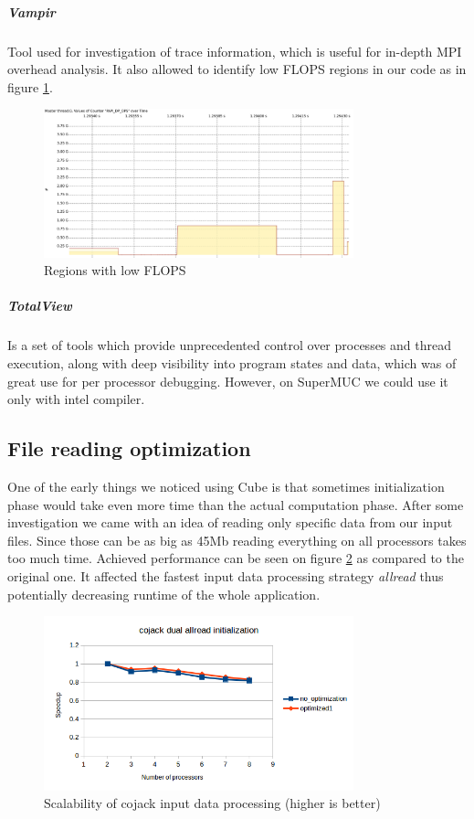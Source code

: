 \documentclass{article}
\begin{document}
\subparagraph{Vampir}
Tool used for investigation of trace information, which is useful for in-depth MPI overhead analysis. It also allowed to identify low FLOPS regions in our code as in figure \ref{fig:7}.
\begin{figure}[h!]
	\begin{center}
		\includegraphics[width=0.8\textwidth]{iter-pent-dual-allread-8-Counter_Data_Timeline_traces.png}
		\caption{Regions with low FLOPS}		
		\label{fig:7}
	\end{center}
\end{figure}

\subparagraph{TotalView}
Is a set of tools which provide unprecedented control over processes and thread execution, along with deep visibility into program states and data, which was of great use for per processor debugging. However, on SuperMUC we could use it only with intel compiler.

\subsection{File reading optimization}
One of the early things we noticed using Cube is that sometimes initialization phase would take even more time than the actual computation phase. After some investigation we came with an idea of reading only specific data from our input files. Since those can be as big as 45Mb reading everything on all processors takes too much time. Achieved performance can be seen on figure \ref{fig:13} as compared to the original one. It affected the fastest input data processing strategy \textit{allread} thus potentially decreasing runtime of the whole application.
\begin{figure}[h!]
	\begin{center}
		\includegraphics[width=0.8\textwidth]{cojack_inputalgorithm_scalability.png}
		\caption{Scalability of cojack input data processing (higher is better)}
		\label{fig:13}
	\end{center}
\end{figure}
\end{document}
